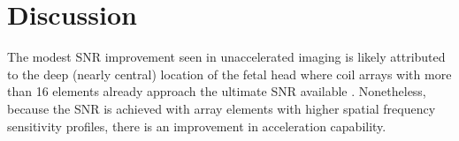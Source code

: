 \chapter{Discussion}
The modest SNR improvement seen in unaccelerated imaging is likely attributed to the deep (nearly central) location of
the fetal head where coil arrays with more than 16 elements already approach the ultimate SNR available
\cite{Wiesinger2004}.  Nonetheless, because the SNR is achieved with array elements with higher spatial frequency
sensitivity profiles, there is an improvement in acceleration capability. 
